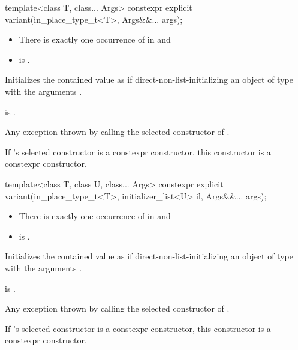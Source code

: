 %
\begin{itemdecl}
template<class T, class... Args> constexpr explicit variant(in_place_type_t<T>, Args&&... args);
\end{itemdecl}

\begin{itemdescr}
\pnum
\constraints
\begin{itemize}
\item There is exactly one occurrence of  in  and
\item {} is .
\end{itemize}

\pnum
\effects
Initializes the contained value as if direct-non-list-initializing
an object of type 
with the arguments .

\pnum
\ensures
{} is .

\pnum
\throws
Any exception thrown by calling the selected constructor of .

\pnum
\remarks
If 's selected constructor is a constexpr constructor, this
constructor is a constexpr constructor.
\end{itemdescr}

%
\begin{itemdecl}
template<class T, class U, class... Args>
  constexpr explicit variant(in_place_type_t<T>, initializer_list<U> il, Args&&... args);
\end{itemdecl}

\begin{itemdescr}
\pnum
\constraints
\begin{itemize}
\item There is exactly one occurrence of  in  and
\item {} is .
\end{itemize}

\pnum
\effects
Initializes the contained value as if direct-non-list-initializing
an object of type 
with the arguments .

\pnum
\ensures
{} is .

\pnum
\throws
Any exception thrown by calling the selected constructor of .

\pnum
\remarks
If 's selected constructor is a constexpr constructor, this
constructor is a constexpr constructor.
\end{itemdescr}

